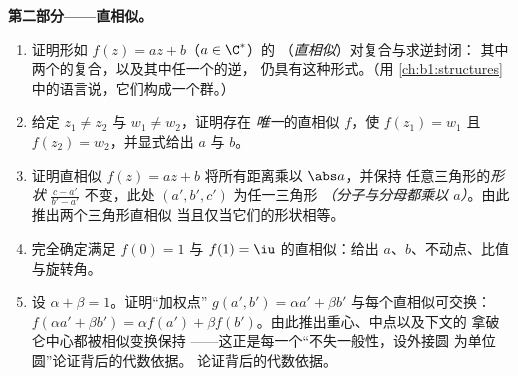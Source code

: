 \begin{problem}
\medskip
\noindent\textbf{第二部分——直相似。}
\begin{enumerate}[resume]
  \item 证明形如 $f(z) = az + b$（$a \in \C^*$）的
        （\emph{直相似}）对复合与求逆封闭：
        其中两个的复合，以及其中任一个的逆，
        仍具有这种形式。（用
        \cref{ch:b1:structures}中的语言说，它们构成一个群。）
  \item 给定 $z_1 \neq z_2$ 与 $w_1 \neq w_2$，证明存在
        \emph{唯一}的直相似 $f$，使 $f(z_1) = w_1$ 且
        $f(z_2) = w_2$，并显式给出 $a$ 与 $b$。
  \item 证明直相似 $f(z) = az + b$ 将所有距离乘以 $\abs a$，并保持
        任意三角形的\emph{形状}
        $\frac{c - a'}{b' - a'}$ 不变，此处 $(a', b', c')$ 为任一三角形
        \emph{（分子与分母都乘以
        $a$）}。由此推出两个三角形直相似
        当且仅当它们的形状相等。
  \item 完全确定满足 $f(0) = 1$
        与 $f(1) = \iu$ 的直相似：给出 $a$、$b$、不动点、比值
        与旋转角。
  \item 设 $\alpha + \beta = 1$。证明“加权点”
        $g(a', b') = \alpha a' + \beta b'$ 与每个直相似可交换：
        $f(\alpha a' + \beta b') = \alpha f(a')
        + \beta f(b')$。由此推出重心、中点以及下文的
        拿破仑中心都被相似变换保持
——这正是每一个“不失一般性，设外接圆
        为单位圆”论证背后的代数依据。
        论证背后的代数依据。
\end{enumerate}


\end{problem}
